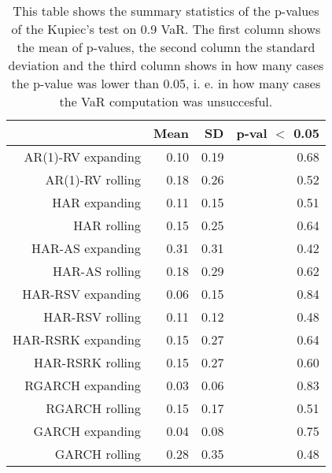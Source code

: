 \begin{table}[ht]
\centering
\begin{tabular}{rrrr}
  \hline
 & Mean & SD & p-val $<$ 0.05 \\ 
  \hline
AR(1)-RV expanding & 0.10 & 0.19 & 0.68 \\ 
  AR(1)-RV rolling & 0.18 & 0.26 & 0.52 \\ 
  HAR expanding & 0.11 & 0.15 & 0.51 \\ 
  HAR rolling & 0.15 & 0.25 & 0.64 \\ 
  HAR-AS expanding & 0.31 & 0.31 & 0.42 \\ 
  HAR-AS rolling & 0.18 & 0.29 & 0.62 \\ 
  HAR-RSV expanding & 0.06 & 0.15 & 0.84 \\ 
  HAR-RSV rolling & 0.11 & 0.12 & 0.48 \\ 
  HAR-RSRK expanding & 0.15 & 0.27 & 0.64 \\ 
  HAR-RSRK rolling & 0.15 & 0.27 & 0.60 \\ 
  RGARCH expanding & 0.03 & 0.06 & 0.83 \\ 
  RGARCH rolling & 0.15 & 0.17 & 0.51 \\ 
  GARCH expanding & 0.04 & 0.08 & 0.75 \\ 
  GARCH rolling & 0.28 & 0.35 & 0.48 \\ 
   \hline
\end{tabular}
\caption[Kupiec's test p-values summary, alpha =0.9]{This table shows the summary statistics of the p-values of the Kupiec's test on 0.9 VaR. 
            The first column shows the mean of p-values, the second column the standard deviation 
            and the third column shows in how many cases the p-value was lower than 0.05, i. e. in how many cases the VaR computation was unsuccesful.} 
\label{Table:Kupiec_test_summary_0.9}
\end{table}
